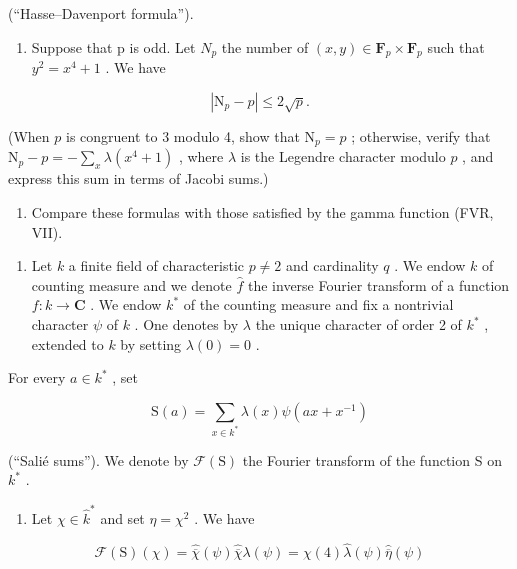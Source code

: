 (“Hasse–Davenport formula”).

\begin{enumerate}
\def\labelenumi{\alph{enumi})}
\setcounter{enumi}{5}
\tightlist
\item
  Suppose that p is odd. Let \(N_{p}\) the number of \((x,y)\in\mathbf{F}_{p}\times\mathbf{F}_{p}\) such that \(y^{2}=x^{4}+1\) . We have
\end{enumerate}

\[
\left| \mathrm{N} _ {p} - p \right| \leqslant 2 \sqrt {p}.
\]

(When \(p\) is congruent to 3 modulo 4, show that \(\mathrm{N}_p = p\) ; otherwise, verify that \(\mathrm{N}_p - p = -\sum_x \lambda(x^4 + 1)\) , where \(\lambda\) is the Legendre character modulo \(p\) , and express this sum in terms of Jacobi sums.)

\begin{enumerate}
\def\labelenumi{\alph{enumi})}
\setcounter{enumi}{6}
\tightlist
\item
  Compare these formulas with those satisfied by the gamma function (FVR, VII).
\end{enumerate}

\begin{enumerate}
\def\labelenumi{\arabic{enumi})}
\setcounter{enumi}{49}
\tightlist
\item
  Let \(k\) a finite field of characteristic \(p \neq 2\) and cardinality \(q\) . We endow \(k\) of counting measure and we denote \(\widehat{f}\) the inverse Fourier transform of a function \(f: k \to \mathbf{C}\) . We endow \(k^*\) of the counting measure and fix a nontrivial character \(\psi\) of \(k\) . One denotes by \(\lambda\) the unique character of order 2 of \(k^*\) , extended to \(k\) by setting \(\lambda(0) = 0\) .
\end{enumerate}

For every \(a \in k^{*}\) , set

\[
\mathrm{S} (a) = \sum_ {x \in k ^ {*}} \lambda (x) \psi (a x + x ^ {- 1})
\]

(“Salié sums”). We denote by \(\mathcal{F}(\mathrm{S})\) the Fourier transform of the function S on \(k^{*}\) .

\begin{enumerate}
\def\labelenumi{\alph{enumi})}
\tightlist
\item
  Let \(\chi \in \widehat{k}^*\) and set \(\eta = \chi^2\) . We have
\end{enumerate}

\[
\mathcal {F} (\mathrm{S}) (\chi) = \widehat {\overline {{\chi}}} (\psi) \widehat {\overline {{\chi}}} \lambda (\psi) = \chi (4) \widehat {\lambda} (\psi) \widehat {\overline {{\eta}}} (\psi)
\]

